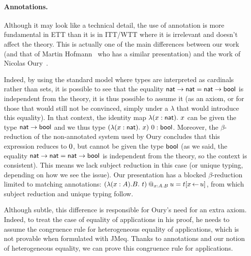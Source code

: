 \paragraph{Annotations.}

Although it may look like a technical detail, the use of annotation is more
fundamental in \acrshort{ETT} than it is in \acrshort{ITT}/\acrshort{WTT}
where it is irrelevant and doesn't affect the theory.
This is actually one of the main differences between our work
(and that of Martin Hofmann~ who has a
similar presentation) and the work of Nicolas
Oury~.

Indeed, by using the standard model where types are interpreted as
cardinals rather than sets, it is possible to see that the equality
$\mathsf{nat} \to \mathsf{nat} = \mathsf{nat} \to \mathsf{bool}$ is independent from the theory, it is
thus possible to assume it (as an axiom, or for those that would still
not be convinced, simply under a $\lambda$ that would introduce this
equality).  In that context, the identity map $\lambda(x : \mathsf{nat}).\ x$
can be given the type $\mathsf{nat} \to \mathsf{bool}$ and we thus type
$(\lambda(x : \mathsf{nat}).\ x)\ 0 : \mathsf{bool}$.  Moreover, the
$\beta$-reduction of the non-annotated system used by Oury concludes
that this expression reduces to $0$, but cannot be given the type
$\mathsf{bool}$ (as we said, the equality $\mathsf{nat} \to \mathsf{nat} = \mathsf{nat} \to \mathsf{bool}$ is
independent from the theory, so the context is consistent). This means
we lack subject reduction in this case (or unique typing,
depending on how we see the issue).  Our presentation has a blocked
$\beta$-reduction limited to matching annotations:
$(\lambda (x:A). B .\ t)\mathbin{@_{x:A.B}} u = t[x \mathop{\leftarrow} u]$, from which subject
reduction and unique typing follow.

Although subtle, this difference is responsible for Oury's need for an
extra axiom. Indeed, to treat the case of equality of applications in
his proof, he needs to assume the congruence rule for heterogeneous
equality of applications, which is not provable when formulated with
\acrshort{JMeq}. Thanks to annotations and our notion of heterogeneous equality,
we can prove this congruence rule for applications.

